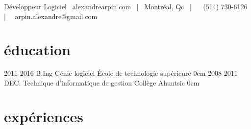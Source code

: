 \documentclass[]{friggeri-cv}
\begin{document}
       {Développeur Logiciel}
       {\faCloud ~alexandrearpin.com~ | \faHome ~Montréal, Qc~ | ~ \faPhone ~(514) 730-6126~ | ~\faEnvelopeAlt  ~arpin.alexandre@gmail.com}

\section{éducation}

\begin{entrylist}
  \entry
    {2011-2016}
    {B.Ing {\normalfont Génie logiciel}}
    {École de technologie supérieure}
    {}
    {0cm}
  \entry
    {2008-2011}
    {DEC. {\normalfont Technique d'informatique de gestion}}
    {Collège Ahuntsic}
    {}
    {0cm}
\end{entrylist}

\section{expériences}
\end{document}
